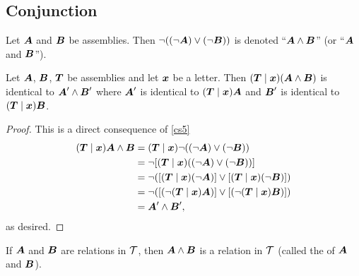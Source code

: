 \subsection{Conjunction}

\begin{definition}
Let $\boldsymbol{A}$ and $\boldsymbol{B}$ be assemblies. Then $\neg((\neg\boldsymbol{A})\lor(\neg\boldsymbol{B}))$
is denoted ``$\boldsymbol{A}\land\boldsymbol{B}$'' (or
``$\boldsymbol{A}$ and $\boldsymbol{B}$'').
\end{definition}

\begin{cs}\label{cs6}
Let $\boldsymbol{A}$, $\boldsymbol{B}$, $\boldsymbol{T}$ be
assemblies and let $\boldsymbol{x}$ be a letter. Then $(\boldsymbol{T}\mid\boldsymbol{x})(\boldsymbol{A}\land\boldsymbol{B})$
is identical to $\boldsymbol{A}'\land\boldsymbol{B}'$ where
$\boldsymbol{A}'$ is identical to $(\boldsymbol{T}\mid\boldsymbol{x})\boldsymbol{A}$
and $\boldsymbol{B}'$ is identical to $(\boldsymbol{T}\mid\boldsymbol{x})\boldsymbol{B}$.
\end{cs}

\begin{proof}
This is a direct consequence of \ref{cs5}
\begin{subequations}
\begin{align}
(\boldsymbol{T}\mid\boldsymbol{x})\boldsymbol{A}\land\boldsymbol{B}
&=(\boldsymbol{T}\mid\boldsymbol{x})\neg((\neg\boldsymbol{A})\lor(\neg\boldsymbol{B}))\\
&=\neg[(\boldsymbol{T}\mid\boldsymbol{x})((\neg\boldsymbol{A})\lor(\neg\boldsymbol{B}))]\\
&=\neg([(\boldsymbol{T}\mid\boldsymbol{x})(\neg\boldsymbol{A})]\lor[(\boldsymbol{T}\mid\boldsymbol{x})(\neg\boldsymbol{B})])\\
&=\neg([(\neg(\boldsymbol{T}\mid\boldsymbol{x})\boldsymbol{A})]\lor[(\neg(\boldsymbol{T}\mid\boldsymbol{x})\boldsymbol{B})])\\
&=\boldsymbol{A}'\land\boldsymbol{B}',
\end{align}
\end{subequations}
as desired.
\end{proof}

\begin{cf}\label{cf9}
If $\boldsymbol{A}$ and $\boldsymbol{B}$ are relations in $\mathcal{T}$,
then $\boldsymbol{A}\land\boldsymbol{B}$ is a relation in $\mathcal{T}$
(called the  of $\boldsymbol{A}$ and $\boldsymbol{B}$).
\end{cf}

